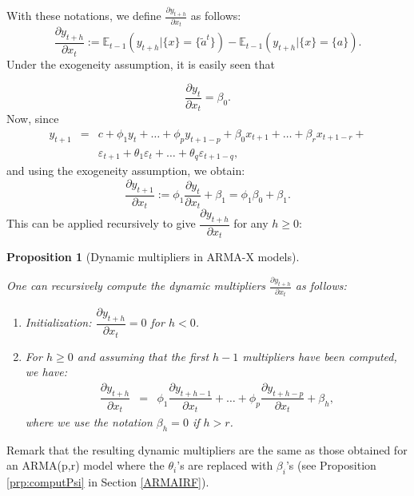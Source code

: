 \documentclass[
  11pt,
]{book}
\providecommand{\tightlist}{%
  \setlength{\itemsep}{0pt}\setlength{\parskip}{0pt}}
\newtheorem{proposition}{Proposition}[chapter]
\theoremstyle{definition}
\theoremstyle{definition}
\theoremstyle{definition}
\theoremstyle{definition}
\theoremstyle{remark}
\begin{document}
With these notations, we define \(\frac{\partial y_{t+h}}{\partial x_t}\) as follows:
\begin{equation}
\frac{\partial y_{t+h}}{\partial x_t} := \mathbb{E}_{t-1}(y_{t+h}|\{x\} = \{\tilde{a}^t\}) - \mathbb{E}_{t-1}(y_{t+h}|\{x\} = \{a\}).\label{eq:dynmultX}
\end{equation}
Under the exogeneity assumption, it is easily seen that

\[
\frac{\partial y_t}{\partial x_t} = \beta_0.
\]
Now, since
\begin{eqnarray*}
y_{t+1} &=& c + \phi_1 y_{t} + \dots + \phi_p y_{t+1-p} + \beta_0 x_{t+1} + \dots + \beta_{r} x_{t+1-r} +\\
&&\varepsilon_{t+1} + \theta_1\varepsilon_{t}+\dots +\theta_{q}\varepsilon_{t+1-q},
\end{eqnarray*}
and using the exogeneity assumption, we obtain:
\[
\frac{\partial y_{t+1}}{\partial x_t} := \phi_1 \frac{\partial y_{t}}{\partial x_t} + \beta_1 = \phi_1\beta_0 + \beta_1.
\]
This can be applied recursively to give \(\dfrac{\partial y_{t+h}}{\partial x_t}\) for any \(h \ge 0\):

\begin{proposition}[Dynamic multipliers in ARMA-X models]
\protect\hypertarget{prp:computPsiARMAX}{}\label{prp:computPsiARMAX}

One can recursively compute the dynamic multipliers \(\frac{\partial y_{t+h}}{\partial x_t}\) as follows:

\begin{enumerate}
\def\labelenumi{\roman{enumi}.}
\tightlist
\item
  Initialization: \(\dfrac{\partial y_{t+h}}{\partial x_t}=0\) for \(h<0\).
\item
  For \(h \ge 0\) and assuming that the first \(h-1\) multipliers have been computed, we have:
  \begin{eqnarray}
  \dfrac{\partial y_{t+h}}{\partial x_t} &=& \phi_1 \dfrac{\partial y_{t+h-1}}{\partial x_t} + \dots + \phi_p \dfrac{\partial y_{t+h-p}}{\partial x_t} + \beta_h,\label{eq:dynmultXrec}
  \end{eqnarray}
  where we use the notation \(\beta_h=0\) if \(h>r\).
\end{enumerate}

\end{proposition}

Remark that the resulting dynamic multipliers are the same as those obtained for an ARMA(p,r) model where the \(\theta_i\)'s are replaced with \(\beta_i\)'s (see Proposition \ref{prp:computPsi} in Section \ref{ARMAIRF}).
\end{document}
